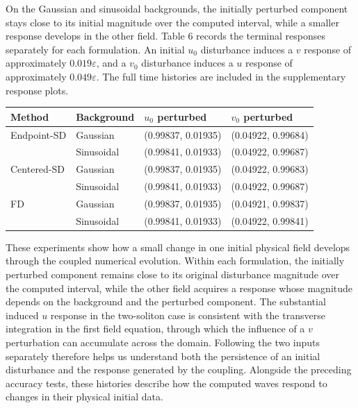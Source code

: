 \documentclass{article}
\theoremstyle{plain}
\theoremstyle{definition}
\begin{document}
On the Gaussian and sinusoidal backgrounds, the initially perturbed component stays close to its initial magnitude over the computed interval, while a smaller response develops in the other field. Table 6 records the terminal responses separately for each formulation. An initial \(u_0\) disturbance induces a \(v\) response of approximately \(0.019\varepsilon\), and a \(v_0\) disturbance induces a \(u\) response of approximately \(0.049\varepsilon\). The full time histories are included in the supplementary response plots.






\FloatBarrier
\begin{center}\begin{minipage}{\linewidth}
\centering
{}
\normalsize
\setlength{\tabcolsep}{6pt}
\renewcommand{\arraystretch}{1.25}\setlength{\extrarowheight}{1pt}
\begin{tabularx}{\linewidth}{YYYY}
\hline
Method & Background & \(u_0\) perturbed & \(v_0\) perturbed \\
\hline
Endpoint-SD & Gaussian & (0.99837, 0.01935) & (0.04922, 0.99684) \\
 & Sinusoidal & (0.99841, 0.01933) & (0.04922, 0.99687) \\
Centered-SD & Gaussian & (0.99837, 0.01935) & (0.04922, 0.99683) \\
 & Sinusoidal & (0.99841, 0.01933) & (0.04922, 0.99687) \\
FD & Gaussian & (0.99837, 0.01935) & (0.04921, 0.99837) \\
 & Sinusoidal & (0.99841, 0.01933) & (0.04922, 0.99841) \\
\hline
\end{tabularx}
\end{minipage}\end{center}

These experiments show how a small change in one initial physical field develops through the coupled numerical evolution. Within each formulation, the initially perturbed component remains close to its original disturbance magnitude over the computed interval, while the other field acquires a response whose magnitude depends on the background and the perturbed component. The substantial induced \(u\) response in the two-soliton case is consistent with the transverse integration in the first field equation, through which the influence of a \(v\) perturbation can accumulate across the domain. Following the two inputs separately therefore helps us understand both the persistence of an initial disturbance and the response generated by the coupling. Alongside the preceding accuracy tests, these histories describe how the computed waves respond to changes in their physical initial data.
\end{document}
